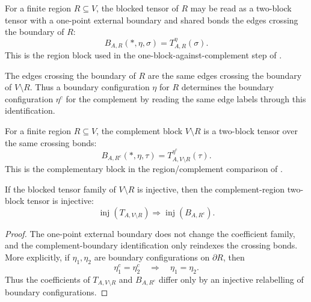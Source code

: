 \begin{definition}%
    \label{def:peps_regionTwoBlock}
    \leanok
    For a finite region $R\subseteq V$, the blocked tensor of $R$ may be read
    as a two-block tensor with a one-point external boundary and shared bonds
    the edges crossing the boundary of $R$:
    \[
        B_{A,R}(*,\eta,\sigma)=T_{A,R}^{\eta}(\sigma).
    \]
    This is the region block used in the one-block-against-complement step of
    \cite[Section~3]{Molnar2018NormalPEPS}.
\end{definition}

\begin{definition}%
    \label{def:peps_regionComplementBoundaryConfig}
    \leanok
    The edges crossing the boundary of $R$ are the same edges crossing the
    boundary of $V\setminus R$. Thus a boundary configuration $\eta$ for $R$
    determines the boundary configuration $\eta^c$ for the complement by reading
    the same edge labels through this identification.
\end{definition}

\begin{definition}%
    \label{def:peps_regionComplementTwoBlock}
    \leanok
    For a finite region $R\subseteq V$, the complement block $V\setminus R$ is
    a two-block tensor over the same crossing bonds:
    \[
        B_{A,R^c}(*,\eta,\tau)
        =
        T_{A,V\setminus R}^{\eta^c}(\tau).
    \]
    This is the complementary block in the region/complement comparison of
    \cite[Section~3]{Molnar2018NormalPEPS}.
\end{definition}

\begin{theorem}%
    \label{thm:peps_isTwoBlockInjective_regionComplementTwoBlock}
    \leanok
    If the blocked tensor family of $V\setminus R$ is injective, then the
    complement-region two-block tensor is injective:
    \[
        \operatorname{inj}(T_{A,V\setminus R})
        \Longrightarrow
        \operatorname{inj}(B_{A,R^c}).
    \]
\end{theorem}
\begin{proof}\leanok
    The one-point external boundary does not change the coefficient family, and
    the complement-boundary identification only reindexes the crossing bonds.
    More explicitly, if $\eta_1,\eta_2$ are boundary configurations on
    $\partial R$, then
    \[
        \eta_1^c=\eta_2^c\quad\Longrightarrow\quad \eta_1=\eta_2 .
    \]
    Thus the coefficients of $T_{A,V\setminus R}$ and $B_{A,R^c}$ differ only
    by an injective relabelling of boundary configurations.
\end{proof}


